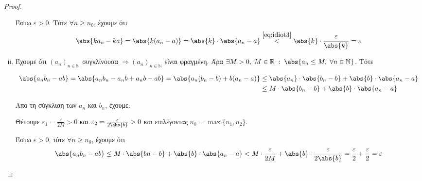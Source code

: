 \documentclass[main.tex]{subfiles}
\begin{document}
\begin{proof}
\begin{enumerate}[i)]
            Έστω $ \varepsilon >0 $. Τότε $ \forall n \geq n_{0} $, 
            έχουμε ότι 
            \[
                \abs{k a_{n}- ka} = \abs{k(a_{n}- a)} = \abs{k} \cdot 
                \abs{a_{n}- a} \overset{\eqref{eq:idiot3}}{<} \abs{k}
                \cdot \frac{\varepsilon}{\abs{k}} = \varepsilon 
            \] 

        \item Έχουμε ότι $ (a_{n})_{n \in \mathbb{N}} $ συγκλίνουσα $ 
            \Rightarrow (a_{n})_{n \in \mathbb{N}} $ είναι φραγμένη. 
            Άρα $ \exists M >0, \; M \in \mathbb{R} \; : \; 
            \abs{a_{n} \leq M, \; \forall n \in \mathbb{N}}$. Τότε 

            \begin{align*}
                \abs{a_{n} b_{n} - ab} = \abs{a_{n}b_{n} - a_{n}b + 
                a_{n}b -ab} = \abs{a_{n}(b_{n}-b)+b(a_{n}-a) } 
                        &\leq \abs{a_{n}}\cdot \abs{b_{n}-b} + \abs{b} 
                        \cdot \abs{a_{n}-a} \\
                        &\leq M \cdot  \abs{b_{n}-b} + \abs {b}\cdot 
                        \abs{a_{n}-a}
            \end{align*}

            Απο τη σύγκλιση των $ a_{n} $ και $ b_{n} $, έχουμε:

            Θέτουμε $ \varepsilon_{1} = \frac{\varepsilon}{2M} >0 $ 
            και $ \varepsilon_{2} = \frac{\varepsilon}{2\abs{b}} >0 $ 
            και επιλέγοντας $ n_{0}= \max \{ n_{1}, n_{2}\} $.

            Έστω $ \varepsilon >0 $, τότε $ \forall n \geq n_{0}$, 
            έχουμε ότι 
            \[
                \abs{a_{n} b_{n} - ab} \leq M \cdot \abs{bn-b} + 
                \abs{b} \cdot \abs{a_{n}- a} < M \cdot 
                \frac{\varepsilon}{2 M} + \abs {b} \cdot 
                \frac{\varepsilon}{2 \abs{b}} =
                \frac{\varepsilon}{2} + \frac{\varepsilon}{2} = 
                \varepsilon
            \]

\end{enumerate}
\end{proof}
\end{document}
